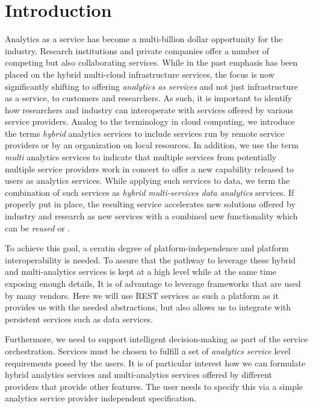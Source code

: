 
\section{Introduction}
\label{sec:summary}


Analytics as a service has become a multi-billion dollar opportunity
for the industry. Research institutions and private companies offer a
number of competing but also collaborating services. While in the past
emphasis has been placed on the hybrid multi-cloud infrastructure
services, the focus is now significantly shifting to offering {\em
analytics as services} and not just infrastructure as a service, to
customers and researchers. As such, it is important to identify how
researchers and industry can interoperate with services offered by
various service providers. Analog to the terminology in cloud
computing, we introduce the terms {\em hybrid} analytics services to
include services run by remote service providers or by an organization
on local resources.  In addition, we use the term {\em multi}
analytics services to indicate that multiple services from potentially
multiple service providers work in concert to offer a new capability
released to users as analytics services. While applying such services
to data, we term the combination of such services as {\em hybrid
multi-services data analytics} services. If properly put in place, the
resulting service accelerates new solutions offered by industry and
research as new services with a combined new functionality which can
be {\em reused} or {\replicated}.

To achieve this goal, a ceratin degree of platform-independence and
platform interoperability is needed.  To assure that the pathway to
leverage these hybrid and multi-analytics services is kept at a high
level while at the same time exposing enough details, It is of
advantage to leverage frameworks that are used by many vendors. Here
we will use REST services as such a platform as it provides us with
the needed abstractions, but also allows us to integrate with
persistent services such as data services.

Furthermore, we need to support intelligent decision-making as part of
the service orchestration. Services must be chosen to fulfill a set of
{\em analytics service} level requirements posed by the users. It is
of particular interest how we can formulate hybrid analytics services
and multi-analytics services offered by different providers that
provide other features. The user needs to specify this via a simple
analytics service provider independent specification.

